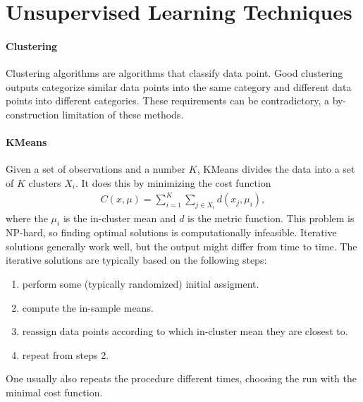 \section{Unsupervised Learning Techniques}

\paragraph{Clustering}
Clustering algorithms are algorithms that classify data point. Good clustering outputs categorize similar data points into the same category and different data points into different categories. These requirements can be contradictory, a by-construction limitation of these methods.

\paragraph{KMeans}
Given a set of observations and a number $K$, KMeans divides the data into a set of $K$ clusters $X_{i}$. It does this by minimizing the cost function
\begin{align*}
C(x, \mu) = \sum\limits_{i = 1}^{K}\sum\limits_{j\in X_{i}}d(x_{j}, \mu_{i}),
\end{align*}
where the $\mu_{i}$ is the in-cluster mean and $d$ is the metric function. This problem is NP-hard, so finding optimal solutions is computationally infeasible. Iterative solutions generally work well, but the output might differ from time to time. The iterative solutions are typically based on the following steps:
\begin{enumerate}
	\item perform some (typically randomized) initial assigment.
	\item compute the in-sample means.
	\item reassign data points according to which in-cluster mean they are closest to.
	\item repeat from steps 2.
\end{enumerate}
One usually also repeats the procedure different times, choosing the run with the minimal cost function. 

